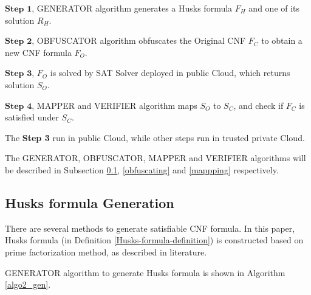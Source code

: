 \documentclass[conference,compsocconf]{IEEEtran}
\begin{document}
$\textbf{Step 1}$, GENERATOR algorithm generates a Husks formula $F_H$ and one of its solution $R_H$.

$\textbf{Step 2}$, OBFUSCATOR algorithm obfuscates the Original CNF $F_C$ to obtain a new CNF formula $F_O$.

$\textbf{Step 3}$, $F_O$ is solved by SAT Solver deployed in public Cloud, which returns solution $S_O$.

$\textbf{Step 4}$, MAPPER and VERIFIER algorithm maps $S_O$ to $S_C$, and check if $F_C$ is satisfied under $S_C$.

% 
% 
% 

The \textbf{Step 3} run in public Cloud, while other steps run in trusted private Cloud.

The GENERATOR, OBFUSCATOR, MAPPER and VERIFIER algorithms will be described in Subsection \ref{genhusk}, \ref{obfuscating}
and \ref{mappping} respectively.

\subsection{Husks formula Generation}\label{genhusk}

There are several methods to generate satisfiable CNF formula\cite{microgenSAT,genSAT}.
In this paper, Husks formula (in Definition \ref{Husks-formula-definition}) is constructed based on prime factorization method,
as described in literature\cite{genSAT}.

GENERATOR algorithm to generate Husks formula is shown in Algorithm \ref{algo2_gen}.
%
%
\end{document}
